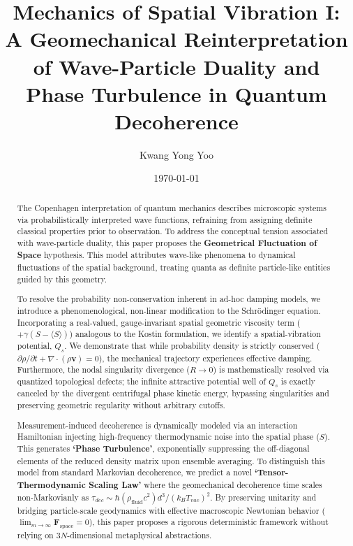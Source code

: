 \documentclass[reprint,amsmath,amssymb,aps,prd]{revtex4-2}
\begin{document}

\title{Mechanics of Spatial Vibration I: A Geomechanical Reinterpretation of Wave-Particle Duality and Phase Turbulence in Quantum Decoherence}

\author{Kwang Yong Yoo}

\date{\today}

\begin{abstract}
The Copenhagen interpretation of quantum mechanics describes microscopic systems via probabilistically interpreted wave functions, refraining from assigning definite classical properties prior to observation. To address the conceptual tension associated with wave-particle duality, this paper proposes the \textbf{Geometrical Fluctuation of Space} hypothesis. This model attributes wave-like phenomena to dynamical fluctuations of the spatial background, treating quanta as definite particle-like entities guided by this geometry. 

To resolve the probability non-conservation inherent in ad-hoc damping models, we introduce a phenomenological, non-linear modification to the Schr\"{o}dinger equation. Incorporating a real-valued, gauge-invariant spatial geometric viscosity term ($+\gamma(S - \langle S \rangle)$) analogous to the Kostin formulation, we identify a spatial-vibration potential, $Q_s$. We demonstrate that while probability density is strictly conserved ($\partial\rho/\partial t + \nabla\cdot(\rho\mathbf{v})=0$), the mechanical trajectory experiences effective damping. Furthermore, the nodal singularity divergence ($R \to 0$) is mathematically resolved via quantized topological defects; the infinite attractive potential well of $Q_s$ is exactly canceled by the divergent centrifugal phase kinetic energy, bypassing singularities and preserving geometric regularity without arbitrary cutoffs.

Measurement-induced decoherence is dynamically modeled via an interaction Hamiltonian injecting high-frequency thermodynamic noise into the spatial phase ($S$). This generates \textbf{`Phase Turbulence'}, exponentially suppressing the off-diagonal elements of the reduced density matrix upon ensemble averaging. To distinguish this model from standard Markovian decoherence, we predict a novel \textbf{`Tensor-Thermodynamic Scaling Law'} where the geomechanical decoherence time scales non-Markovianly as $\tau_{dec} \sim \hbar (\rho_{\mathrm{fluid}} c^2) d^3 / (k_B T_{vac})^2$. By preserving unitarity and bridging particle-scale geodynamics with effective macroscopic Newtonian behavior ($\lim_{m \to \infty} \mathbf{F}_{\mathrm{space}} = 0$), this paper proposes a rigorous deterministic framework without relying on $3N$-dimensional metaphysical abstractions.
\end{abstract}
\end{document}
